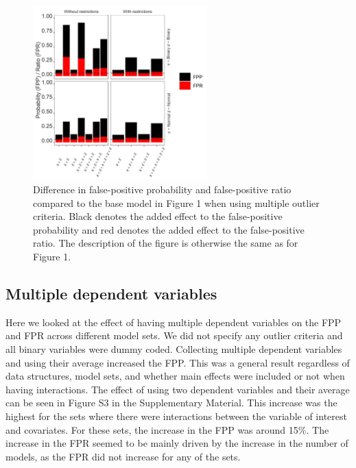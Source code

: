 \begin{figure}[hbt!]
\includegraphics[width=0.6\textwidth]{R/Analysis/Result/Figures/Figure1B.jpeg}
\centering
\caption{Difference in false-positive probability and false-positive ratio compared to the base model in Figure 1 when using multiple outlier criteria. Black denotes the added effect to the false-positive probability and red denotes the added effect to the false-positive ratio.  The description of the figure is otherwise the same as for Figure 1.}
\label{fig:mainfigure}
\end{figure}

\subsection{Multiple dependent variables}
Here we looked at the effect of having multiple dependent variables on the FPP and FPR across different model sets. We did not specify any outlier criteria and all binary variables were dummy coded. Collecting multiple dependent variables and using their average increased the FPP. This was a general result regardless of data structures, model sets, and whether main effects were included or not when having interactions. The effect of using two dependent variables and their average can be seen in Figure S3 in the Supplementary Material. This increase was the highest for the sets where there were interactions between the variable of interest and covariates. For these sets, the increase in the FPP was around 15\%. The increase in the FPR seemed to be mainly driven by the increase in the number of models, as the FPR did not increase for any of the sets. 

